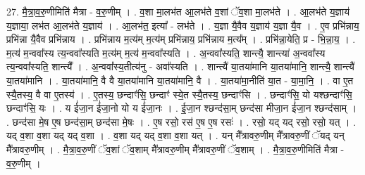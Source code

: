 \documentclass[17pt]{extarticle}
\begin{document}
27. मै॒त्रा॒व॒रु॒णीमिति॑ मैत्रा - व॒रु॒णीम् । . व॒शा मा॒लभ॑त आ॒लभ॑ते व॒शां ॅव॒शा मा॒लभ॑ते । . आ॒लभ॑ते य॒ज्ञाय॑ य॒ज्ञाया॒ लभ॑त आ॒लभ॑ते य॒ज्ञाय॑ । . आ॒लभ॑त॒ इत्या᳚ - लभ॑ते । . य॒ज्ञा यै॒वैव य॒ज्ञाय॑ य॒ज्ञा यै॒व । . ए॒व प्रभि॑न्नाय॒ प्रभि॑न्ना यै॒वैव प्रभि॑न्नाय । . प्रभि॑न्नाय म॒त्य॑म् म॒त्य॑म् प्रभि॑न्नाय॒ प्रभि॑न्नाय म॒त्य᳚म् । . प्रभि॑न्ना॒येति॒ प्र - भि॒न्ना॒य॒ । . म॒त्य॑ म॒न्ववा᳚स्य त्य॒न्ववा᳚स्यति म॒त्य॑म् म॒त्य॑ म॒न्ववा᳚स्यति । . अ॒न्ववा᳚स्यति॒ शान्त्यै॒ शान्त्या॑ अ॒न्ववा᳚स्य त्य॒न्ववा᳚स्यति॒ शान्त्यै᳚ । . अ॒न्ववा᳚स्य॒तीत्य॑नु - अवा᳚स्यति । . शान्त्यै॑ या॒तया॑मानि या॒तया॑मानि॒ शान्त्यै॒ शान्त्यै॑ या॒तया॑मानि । . या॒तया॑मानि॒ वै वै या॒तया॑मानि या॒तया॑मानि॒ वै । . या॒तया॑मा॒नीति॑ या॒त - या॒मा॒नि॒ । . वा ए॒त स्यै॒तस्य॒ वै वा ए॒तस्य॑ । . ए॒तस्य॒ छन्दाꣳ॑सि॒ छन्दाꣳ॑ स्ये॒त स्यै॒तस्य॒ छन्दाꣳ॑सि । . छन्दाꣳ॑सि॒ यो यश्छन्दाꣳ॑सि॒ छन्दाꣳ॑सि॒ यः । . य ई॑जा॒न ई॑जा॒नो यो य ई॑जा॒नः । . ई॒जा॒न श्छन्द॑सा॒म् छन्द॑सा मीजा॒न ई॑जा॒न श्छन्द॑साम् । . छन्द॑सा मे॒ष ए॒ष छन्द॑सा॒म् छन्द॑सा मे॒षः । . ए॒ष रसो॒ रस॑ ए॒ष ए॒ष रसः॑ । . रसो॒ यद् यद् रसो॒ रसो॒ यत् । . यद् व॒शा व॒शा यद् यद् व॒शा । . व॒शा यद् यद् व॒शा व॒शा यत् । . यन् मै᳚त्रावरु॒णीम् मै᳚त्रावरु॒णीं ॅयद् यन् मै᳚त्रावरु॒णीम् । . मै॒त्रा॒व॒रु॒णीं ॅव॒शां ॅव॒शाम् मै᳚त्रावरु॒णीम् मै᳚त्रावरु॒णीं ॅव॒शाम् । . मै॒त्रा॒व॒रु॒णीमिति॑ मैत्रा - व॒रु॒णीम् । \newline
\end{document}
